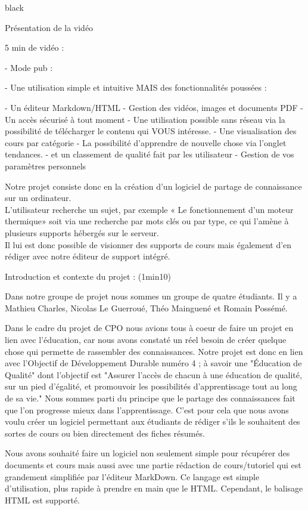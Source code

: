 \begin{items}{black}{\Bullet}
\item Présentation de la vidéo

5 min de vidéo : 

- Mode pub : 

- Une utilisation simple et intuitive MAIS des fonctionnalités poussées : 

- Un éditeur Markdown/HTML
- Gestion des vidéos, images et documents PDF
- Un accès sécurisé à tout moment
- Une utilisation possible sans réseau via la possibilité de télécharger le contenu qui VOUS intéresse.
- Une visualisation des cours par catégorie
- La possibilité d'apprendre de nouvelle chose via l'onglet tendances.
- et un classement de qualité fait par les utilisateur
- Gestion de vos paramètres personnels


Notre projet consiste donc en la création d’un logiciel de partage de connaissance sur un ordinateur.\\
L’utilisateur recherche un sujet, par exemple « Le fonctionnement d'un moteur thermique» soit via une recherche par mots clés ou par type, ce qui l’amène à plusieurs supports hébergés sur le serveur.\\
Il lui est donc possible de visionner des supports de cours mais également d'en rédiger avec notre éditeur de support intégré.

\item Introduction et contexte du projet : (1min10)

Dans notre groupe de projet nous sommes un groupe de quatre étudiants. Il y a Mathieu Charles, Nicolas Le Guerroué, Théo Mainguené et Romain Possémé. 

Dans le cadre du projet de CPO nous avions tous à coeur de faire un projet en lien avec l'éducation, car nous avons constaté un réel besoin de créer quelque chose qui permette de rassembler des connaissances. Notre projet est donc en lien avec l'Objectif de Développement Durable numéro 4 ; à savoir une "Éducation de Qualité" dont l'objectif est "Assurer l'accès de chacun à une éducation de qualité, sur un pied d'égalité, et promouvoir les possibilités d'apprentissage tout au long de sa vie."
Nous sommes parti du principe que le partage des connaissances fait que l'on progresse mieux dans l'apprentissage. C'est pour cela que nous avons voulu créer un logiciel permettant aux étudiants de rédiger s'ils le souhaitent des sortes de cours ou bien directement des fiches résumés. 

Nous avons souhaité faire un logiciel non seulement simple pour récupérer des documents et cours mais aussi avec une partie rédaction de cours/tutoriel qui est grandement simplifiée par l'éditeur MarkDown.
Ce langage est simple d'utilisation, plus rapide à prendre en main que le HTML. Cependant, le balisage HTML est supporté.


\end{items}
